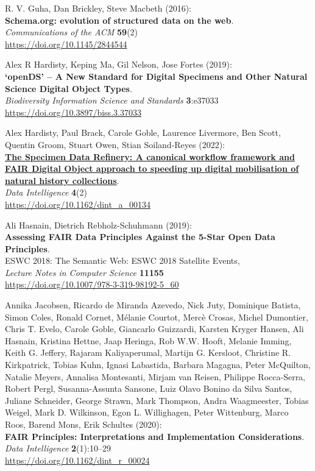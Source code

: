 \begin{thebibliography}{9}
R. V. Guha, Dan Brickley, Steve Macbeth (2016):\\
\textbf{Schema.org: evolution of structured data on the web}.\\
\emph{Communications of the ACM} \textbf{59}(2)\\
\url{https://doi.org/10.1145/2844544}

Alex R Hardisty, Keping Ma, Gil Nelson, Jose Fortes
(2019):\\
\textbf{`openDS' -- A New Standard for Digital Specimens and Other
Natural Science Digital Object Types}.\\
\emph{Biodiversity Information Science and Standards}
\textbf{3}:e37033\\
\url{https://doi.org/10.3897/biss.3.37033}

Alex Hardisty, Paul Brack, Carole Goble, Laurence
Livermore, Ben Scott, Quentin Groom, Stuart Owen, Stian Soiland-Reyes
(2022):\\
\href{../specimen-data-refinery/}{\textbf{The Specimen Data Refinery: A
canonical workflow framework and FAIR Digital Object approach to
speeding up digital mobilisation of natural history collections}}.\\
\emph{Data Intelligence} \textbf{4}(2)\\
\url{https://doi.org/10.1162/dint_a_00134}

Ali Hasnain, Dietrich Rebholz-Schuhmann (2019):\\
\textbf{Assessing FAIR Data Principles Against the 5-Star Open Data
Principles}.\\
ESWC 2018: The Semantic Web: ESWC 2018 Satellite Events,\\
\emph{Lecture Notes in Computer Science} \textbf{11155}\\
\url{https://doi.org/10.1007/978-3-319-98192-5_60}

Annika Jacobsen, Ricardo de Miranda Azevedo, Nick
Juty, Dominique Batista, Simon Coles, Ronald Cornet, Mélanie Courtot,
Mercè Crosas, Michel Dumontier, Chris T. Evelo, Carole Goble, Giancarlo
Guizzardi, Karsten Kryger Hansen, Ali Hasnain, Kristina Hettne, Jaap
Heringa, Rob W.W. Hooft, Melanie Imming, Keith G. Jeffery, Rajaram
Kaliyaperumal, Martijn G. Kersloot, Christine R. Kirkpatrick, Tobias
Kuhn, Ignasi Labastida, Barbara Magagna, Peter McQuilton, Natalie
Meyers, Annalisa Montesanti, Mirjam van Reisen, Philippe Rocca-Serra,
Robert Pergl, Susanna-Assunta Sansone, Luiz Olavo Bonino da Silva
Santos, Juliane Schneider, George Strawn, Mark Thompson, Andra
Waagmeester, Tobias Weigel, Mark D. Wilkinson, Egon L. Willighagen,
Peter Wittenburg, Marco Roos, Barend Mons, Erik Schultes (2020):\\
\textbf{FAIR Principles: Interpretations and Implementation
Considerations}.\\
\emph{Data Intelligence} \textbf{2}(1):10--29\\
\url{https://doi.org/10.1162/dint_r_00024}


\end{thebibliography}
